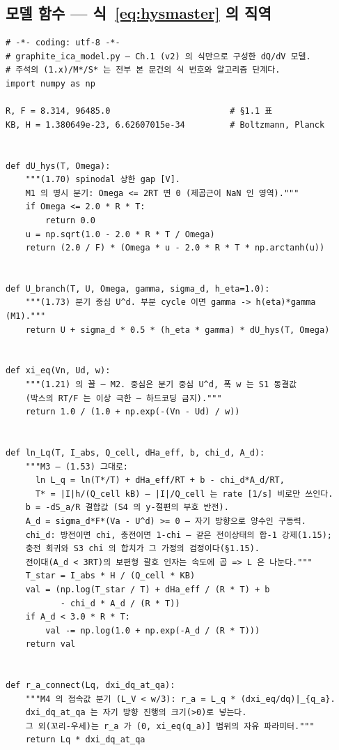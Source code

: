 \documentclass[11pt,a4paper]{article}
\begin{document}
\subsection{모델 함수 — 식~\eqref{eq:hysmaster} 의 직역}\label{sec:codemodel}
\begin{footnotesize}
\begin{verbatim}
# -*- coding: utf-8 -*-
# graphite_ica_model.py — Ch.1 (v2) 의 식만으로 구성한 dQ/dV 모델.
# 주석의 (1.x)/M*/S* 는 전부 본 문건의 식 번호와 알고리즘 단계다.
import numpy as np

R, F = 8.314, 96485.0                        # §1.1 표
KB, H = 1.380649e-23, 6.62607015e-34         # Boltzmann, Planck


def dU_hys(T, Omega):
    """(1.70) spinodal 상한 gap [V].
    M1 의 명시 분기: Omega <= 2RT 면 0 (제곱근이 NaN 인 영역)."""
    if Omega <= 2.0 * R * T:
        return 0.0
    u = np.sqrt(1.0 - 2.0 * R * T / Omega)
    return (2.0 / F) * (Omega * u - 2.0 * R * T * np.arctanh(u))


def U_branch(T, U, Omega, gamma, sigma_d, h_eta=1.0):
    """(1.73) 분기 중심 U^d. 부분 cycle 이면 gamma -> h(eta)*gamma (M1)."""
    return U + sigma_d * 0.5 * (h_eta * gamma) * dU_hys(T, Omega)


def xi_eq(Vn, Ud, w):
    """(1.21) 의 꼴 — M2. 중심은 분기 중심 U^d, 폭 w 는 S1 동결값
    (박스의 RT/F 는 이상 극한 — 하드코딩 금지)."""
    return 1.0 / (1.0 + np.exp(-(Vn - Ud) / w))


def ln_Lq(T, I_abs, Q_cell, dHa_eff, b, chi_d, A_d):
    """M3 — (1.53) 그대로:
      ln L_q = ln(T*/T) + dHa_eff/RT + b - chi_d*A_d/RT,
      T* = |I|h/(Q_cell kB) — |I|/Q_cell 는 rate [1/s] 비로만 쓰인다.
    b = -dS_a/R 결합값 (S4 의 y-절편의 부호 반전).
    A_d = sigma_d*F*(Va - U^d) >= 0 — 자기 방향으로 양수인 구동력.
    chi_d: 방전이면 chi, 충전이면 1-chi — 같은 전이상태의 합-1 강제(1.15);
    충전 회귀와 S3 chi 의 합치가 그 가정의 검정이다(§1.15).
    전이대(A_d < 3RT)의 보편형 괄호 인자는 속도에 곱 => L 은 나눈다."""
    T_star = I_abs * H / (Q_cell * KB)
    val = (np.log(T_star / T) + dHa_eff / (R * T) + b
           - chi_d * A_d / (R * T))
    if A_d < 3.0 * R * T:
        val -= np.log(1.0 + np.exp(-A_d / (R * T)))
    return val


def r_a_connect(Lq, dxi_dq_at_qa):
    """M4 의 접속값 분기 (L_V < w/3): r_a = L_q * (dxi_eq/dq)|_{q_a}.
    dxi_dq_at_qa 는 자기 방향 진행의 크기(>0)로 넣는다.
    그 외(꼬리-우세)는 r_a 가 (0, xi_eq(q_a)] 범위의 자유 파라미터."""
    return Lq * dxi_dq_at_qa



\end{verbatim}
\end{footnotesize}
\end{document}
